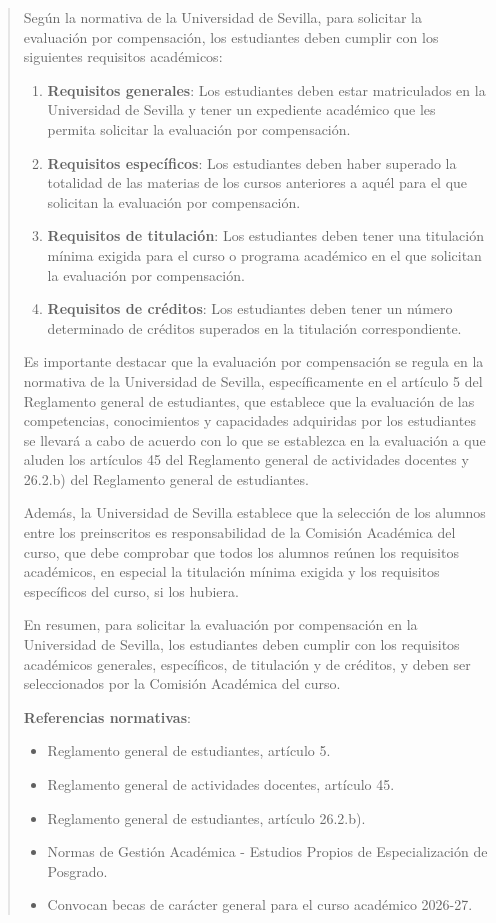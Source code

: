 \documentclass[12pt,a4paper,oneside]{report}
\begin{document}
\begin{itemize}
\begin{itemize}
\begin{quote}
Según la normativa de la Universidad de Sevilla, para solicitar la evaluación por compensación, los estudiantes deben cumplir con los siguientes requisitos académicos:

\begin{enumerate}
  \item \textbf{Requisitos generales}: Los estudiantes deben estar matriculados en la Universidad de Sevilla y tener un expediente académico que les permita solicitar la evaluación por compensación.
  \item \textbf{Requisitos específicos}: Los estudiantes deben haber superado la totalidad de las materias de los cursos anteriores a aquél para el que solicitan la evaluación por compensación.
  \item \textbf{Requisitos de titulación}: Los estudiantes deben tener una titulación mínima exigida para el curso o programa académico en el que solicitan la evaluación por compensación.
  \item \textbf{Requisitos de créditos}: Los estudiantes deben tener un número determinado de créditos superados en la titulación correspondiente.
\end{enumerate}

Es importante destacar que la evaluación por compensación se regula en la normativa de la Universidad de Sevilla, específicamente en el artículo 5 del Reglamento general de estudiantes, que establece que la evaluación de las competencias, conocimientos y capacidades adquiridas por los estudiantes se llevará a cabo de acuerdo con lo que se establezca en la evaluación a que aluden los artículos 45 del Reglamento general de actividades docentes y 26.2.b) del Reglamento general de estudiantes.

Además, la Universidad de Sevilla establece que la selección de los alumnos entre los preinscritos es responsabilidad de la Comisión Académica del curso, que debe comprobar que todos los alumnos reúnen los requisitos académicos, en especial la titulación mínima exigida y los requisitos específicos del curso, si los hubiera.

En resumen, para solicitar la evaluación por compensación en la Universidad de Sevilla, los estudiantes deben cumplir con los requisitos académicos generales, específicos, de titulación y de créditos, y deben ser seleccionados por la Comisión Académica del curso.

\textbf{Referencias normativas}:

\begin{itemize}
  \item Reglamento general de estudiantes, artículo 5.
  \item Reglamento general de actividades docentes, artículo 45.
  \item Reglamento general de estudiantes, artículo 26.2.b).
  \item Normas de Gestión Académica - Estudios Propios de Especialización de Posgrado.
  \item Convocan becas de carácter general para el curso académico 2026-27.
\end{itemize}


\end{quote}
\end{itemize}
\end{itemize}
\end{document}
